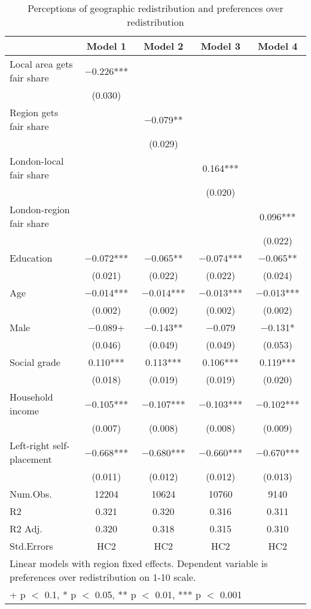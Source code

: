 \documentclass[
]{article}
\begin{document}
\begin{table}

\caption{\label{tab:fairshare_redist}Perceptions of geographic redistribution and preferences over redistribution}
\centering
\begin{tabular}[t]{lcccc}
\toprule
  & Model 1 & Model 2 & Model 3 & Model 4\\
\midrule
Local area gets fair share & \num{-0.226}*** &  &  & \\
 & (\num{0.030}) &  &  & \\
Region gets fair share &  & \num{-0.079}** &  & \\
 &  & (\num{0.029}) &  & \\
London-local fair share &  &  & \num{0.164}*** & \\
 &  &  & (\num{0.020}) & \\
London-region fair share &  &  &  & \num{0.096}***\\
 &  &  &  & (\num{0.022})\\
Education & \num{-0.072}*** & \num{-0.065}** & \num{-0.074}*** & \num{-0.065}**\\
 & (\num{0.021}) & (\num{0.022}) & (\num{0.022}) & (\num{0.024})\\
Age & \num{-0.014}*** & \num{-0.014}*** & \num{-0.013}*** & \num{-0.013}***\\
 & (\num{0.002}) & (\num{0.002}) & (\num{0.002}) & (\num{0.002})\\
Male & \num{-0.089}+ & \num{-0.143}** & \num{-0.079} & \num{-0.131}*\\
 & (\num{0.046}) & (\num{0.049}) & (\num{0.049}) & (\num{0.053})\\
Social grade & \num{0.110}*** & \num{0.113}*** & \num{0.106}*** & \num{0.119}***\\
 & (\num{0.018}) & (\num{0.019}) & (\num{0.019}) & (\num{0.020})\\
Household income & \num{-0.105}*** & \num{-0.107}*** & \num{-0.103}*** & \num{-0.102}***\\
 & (\num{0.007}) & (\num{0.008}) & (\num{0.008}) & (\num{0.009})\\
Left-right self-placement & \num{-0.668}*** & \num{-0.680}*** & \num{-0.660}*** & \num{-0.670}***\\
 & (\num{0.011}) & (\num{0.012}) & (\num{0.012}) & (\num{0.013})\\
\midrule
Num.Obs. & \num{12204} & \num{10624} & \num{10760} & \num{9140}\\
R2 & \num{0.321} & \num{0.320} & \num{0.316} & \num{0.311}\\
R2 Adj. & \num{0.320} & \num{0.318} & \num{0.315} & \num{0.310}\\
Std.Errors & HC2 & HC2 & HC2 & HC2\\
\bottomrule
\multicolumn{5}{l}{\rule{0pt}{1em}Linear models with region fixed effects.
             Dependent variable is preferences over redistribution on 1-10 scale.}\\
\multicolumn{5}{l}{\rule{0pt}{1em}+ p $<$ 0.1, * p $<$ 0.05, ** p $<$ 0.01, *** p $<$ 0.001}\\
\end{tabular}
\end{table}
\end{document}
